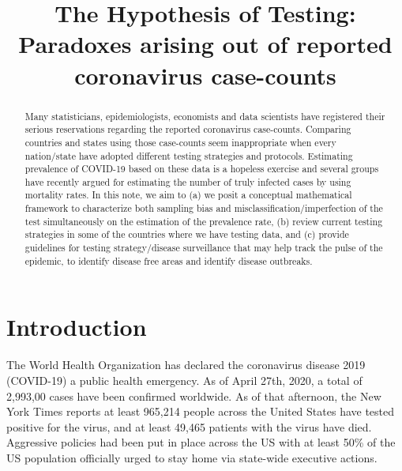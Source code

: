 \documentclass[11pt]{article}
\numberwithin{equation}{section}
\theoremstyle{plain}
\begin{document}
\title{The Hypothesis of Testing: Paradoxes arising out of reported coronavirus case-counts}
\maketitle

\begin{abstract}
Many statisticians, epidemiologists, economists and data scientists have registered their serious reservations regarding the reported coronavirus case-counts. Comparing countries and states using those case-counts seem inappropriate when every nation/state have adopted different testing strategies and protocols. Estimating prevalence of COVID-19 based on these data is a hopeless exercise and several groups have recently argued for estimating the number of truly infected cases by using mortality rates.
In this note, we aim to (a)	we posit a conceptual mathematical framework to characterize both sampling bias and misclassification/imperfection of the test simultaneously on the estimation of the prevalence rate, (b)	review current testing strategies in some of the countries where we have testing data, and (c) provide guidelines for testing strategy/disease surveillance that may help track the pulse of the epidemic, to identify disease free areas and identify disease outbreaks.
\end{abstract}

\section{Introduction}
The World Health Organization has declared the coronavirus disease 2019 (COVID-19) a public health emergency.  As of April 27th, 2020, a total of 2,993,00 cases have been confirmed worldwide.  As of that afternoon, the New York Times reports at least 965,214 people across the United States have tested positive for the virus, and at least 49,465 patients with the virus have died.  Aggressive policies had been put in place across the US with at least 50\% of the US population officially urged to stay home via state-wide executive actions.
\end{document}
